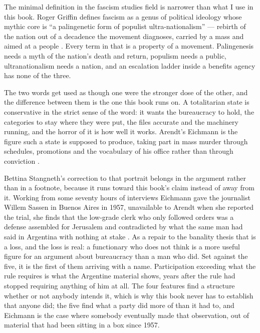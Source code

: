 The minimal definition in the fascism studies field is narrower than what I use in this book. Roger Griffin defines fascism as a genus of political ideology whose mythic core is “a palingenetic form of populist ultra-nationalism” — rebirth of the nation out of a decadence the movement diagnoses, carried by a mass and aimed at a people \autocite{griffin1991nature}. Every term in that is a property of a movement. Palingenesis needs a myth of the nation's death and return, populism needs a public, ultranationalism needs a nation, and an escalation ladder inside a benefits agency has none of the three.


The two words get used as though one were the stronger dose of the other, and the difference between them is the one this book runs on. A totalitarian state is conservative in the strict sense of the word: it wants the bureaucracy to hold, the categories to stay where they were put, the files accurate and the machinery running, and the horror of it is how well it works. Arendt's Eichmann is the figure such a state is supposed to produce, taking part in mass murder through schedules, promotions and the vocabulary of his office rather than through conviction \autocite{arendt1963eichmann}.

Bettina Stangneth's correction to that portrait belongs in the argument rather than in a footnote, because it runs toward this book's claim instead of away from it. Working from some seventy hours of interviews Eichmann gave the journalist Willem Sassen in Buenos Aires in 1957, unavailable to Arendt when she reported the trial, she finds that the low-grade clerk who only followed orders was a defense assembled for Jerusalem and contradicted by what the same man had said in Argentina with nothing at stake \autocite{stangneth2014eichmann}. As a repair to the banality thesis that is a loss, and the loss is real: a functionary who does not think is a more useful figure for an argument about bureaucracy than a man who did. Set against the five, it is the first of them arriving with a name. Participation exceeding what the rule requires is what the Argentine material shows, years after the rule had stopped requiring anything of him at all. The four features find a structure whether or not anybody intends it, which is why this book never has to establish that anyone did; the five find what a party did more of than it had to, and Eichmann is the case where somebody eventually made that observation, out of material that had been sitting in a box since 1957.

